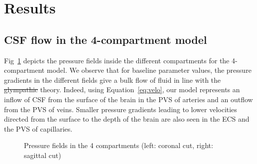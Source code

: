 \documentclass[a4paper,11pt]{article} %
\newcommand{\1}{^{(1)}}
\newcommand{\2}{^{(2)}}
\providecommand{\DIFaddtex}[1]{{\protect\color{blue}\uwave{#1}}} %
\providecommand{\DIFdeltex}[1]{{\protect\color{red}\sout{#1}}}                      %
\providecommand{\DIFaddbegin}{} %
\providecommand{\DIFaddend}{} %
\providecommand{\DIFdelbegin}{} %
\providecommand{\DIFdelend}{} %
\providecommand{\DIFadd}[1]{\texorpdfstring{\DIFaddtex{#1}}{#1}} %
\providecommand{\DIFdel}[1]{\texorpdfstring{\DIFdeltex{#1}}{}} %
\newcommand{\DIFscaledelfig}{0.5}
\newlength{\DIFdelgraphicswidth} %
\newlength{\DIFdelgraphicsheight} %
\newcommand{\DIFaddincludegraphics}[2][]{{\color{blue}\fbox{\DIFOincludegraphics[#1]{#2}}}} %
\newcommand{\DIFdelincludegraphics}[2][]{%
\sbox{\DIFdelgraphicsbox}{\DIFOincludegraphics[#1]{#2}}%
\settoboxwidth{\DIFdelgraphicswidth}{\DIFdelgraphicsbox} %
\settoboxtotalheight{\DIFdelgraphicsheight}{\DIFdelgraphicsbox} %
\scalebox{\DIFscaledelfig}{%
\parbox[b]{\DIFdelgraphicswidth}{\usebox{\DIFdelgraphicsbox}\\[-\baselineskip] \rule{\DIFdelgraphicswidth}{0em}}\llap{\resizebox{\DIFdelgraphicswidth}{\DIFdelgraphicsheight}{%
\setlength{\unitlength}{\DIFdelgraphicswidth}%
\begin{picture}(1,1)%
\thicklines\linethickness{2pt} %
{\color[rgb]{1,0,0}\put(0,0){\framebox(1,1){}}}%
{\color[rgb]{1,0,0}\put(0,0){\line( 1,1){1}}}%
{\color[rgb]{1,0,0}\put(0,1){\line(1,-1){1}}}%
\end{picture}%
}\hspace*{3pt}}} %
} %
\DeclareRobustCommand{\DIFaddbegin}{\DIFOaddbegin \let\includegraphics\DIFaddincludegraphics} %
\DeclareRobustCommand{\DIFaddend}{\DIFOaddend \let\includegraphics\DIFOincludegraphics} %
\DeclareRobustCommand{\DIFdelbegin}{\DIFOdelbegin \let\includegraphics\DIFdelincludegraphics} %
\DeclareRobustCommand{\DIFdelend}{\DIFOaddend \let\includegraphics\DIFOincludegraphics} %
\begin{document}
\section{Results}
\label{sec:results}

\label{sec:application}

\subsection{CSF flow in the 4-compartment model}
Fig~\ref{fig:pressure-Inulin-compartments} depicts the pressure fields inside the different compartments for the 4-compartment model. We observe that for baseline parameter values, the pressure gradients in the different fields give a bulk flow of fluid in line with the \DIFdelbegin \DIFdel{glympathic }\DIFdelend \DIFaddbegin \DIFadd{glymphatic }\DIFaddend theory. Indeed, using Equation~\eqref{eq:velo}, our model represents an inflow of CSF from the surface of the brain in the PVS of arteries and an outflow from the PVS of veins. Smaller pressure gradients leading to lower velocities directed from the surface to the depth of the brain are also seen in the ECS and the PVS of capillaries. 
\begin{figure}[htbp]
    \centering
    \caption{Pressure fields in the 4 compartments (left: coronal cut, right: sagittal cut)}
    \label{fig:pressure-Inulin-compartments}
\end{figure}
\end{document}
